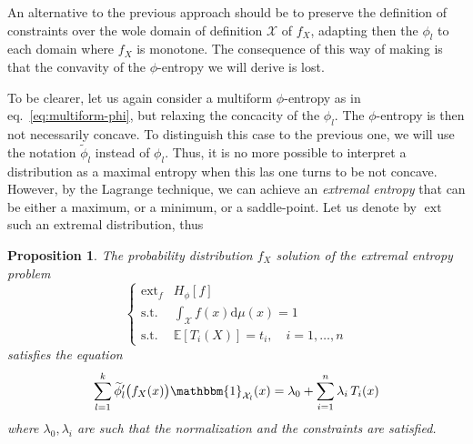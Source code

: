 \documentclass[english,onecolumn]{elsarticle}
\def\dmu{\mathrm{d}\mu}
\def\X{\mathcal{X}}
\def\un{\mathbbm{1}}
\def\ext{\operatorname{ext}}
\newcommand\Esp[1]{\mathbb{E}\left[ #1 \right]}
\newtheorem{proposition}{Proposition}
\begin{document}
An alternative to the previous approach  should be to preserve the definition of
constraints over the wole domain of  definition $\X$ of $f_X$, adapting then the
$\phi_l$ to each domain where $f_X$  is monotone. The consequence of this way of
making is that the convavity of the $\phi$-entropy we will derive is lost.

To  be  clearer,  let  us  again  consider  a  multiform  $\phi$-entropy  as  in
eq.~\eqref{eq:multiform-phi}, but  relaxing the concacity of  the $\phi_l$.  The
$\phi$-entropy is then not necessarily concave.  To distinguish this case to the
previous one, we will use the notation $\widetilde{\phi}_l$ instead of $\phi_l$.
%
Thus, it  is no more possible to  interpret a distribution as  a maximal entropy
when this las  one turns to be not concave. However,  by the Lagrange technique,
we can  achieve an {\em  extremal entropy}  that can be  either a maximum,  or a
minimum,  or  a  saddle-point.  Let   us  denote  by  $\ext$  such  an  extremal
distribution, thus
%
\begin{proposition}
  The probability distribution $f_X$ solution of the extremal entropy problem
%
  \begin{equation}
  \begin{cases}
  \ext_f & H_\phi[f]\\[5mm]
  \text{s.t. } & \displaystyle \int_\X f(x) \dmu(x) = 1\\[5mm]
  \text{s.t. } & \Esp{T_i(X)} = t_i,  \quad i = 1, \ldots, n
  \end{cases}
  \label{eq:ExtEntMulti}
  \end{equation}
  satisfies the equation
  \begin{equation}
  \sum_{l=1}^k \widetilde{\phi}_l' \big( f_X(x) \big) \un_{\X_l}(x) =
  \lambda_0 + \sum_{i=1}^n \lambda_i \, T_i(x)
  \label{eq:sol-phi-multi-notconcave}
  \end{equation}
%
  where  $\lambda_0,  \lambda_i$  are   such  that  the  normalization  and  the
  constraints are satisfied.
\end{proposition}
\end{document}
